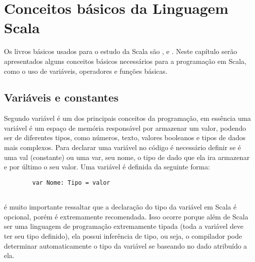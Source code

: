 

\chapter{ Conceitos b\'{a}sicos da Linguagem Scala}

Os livros b\'{a}sicos usados para o estudo da Scala s\~{a}o \cite{Odersky}, \cite{Sfregola2021} e \cite{Wampler2021}.
Neste cap\'{i}tulo serão apresentados alguns conceitos b\'{a}sicos necess\'{a}rios para a programa\c{c}\~{a}o em Scala, como o uso de vari\'{a}veis, operadores e funções b\'{a}sicas.


    \section{Vari\'{a}veis e constantes}
	
	Segundo \cite{Odersky} vari\'{a}vel \'{e} um dos principais conceitos da programa\c{c}\~{a}o, em ess\^{e}ncia uma vari\'{a}vel \'{e} um espaço de mem\'{o}ria respons\'{a}vel por armazenar um valor, podendo ser de diferentes tipos, como n\'{u}meros, texto, valores booleanos e tipos de dados mais complexos. Para declarar uma vari\'{a}vel no c\'{o}digo \'{e} necess\'{a}rio definir se \'{e} uma val (constante) ou uma var, seu nome, o tipo de dado que ela ira armazenar e por   \'{u}ltimo o seu valor.
	Uma vari\'{a}vel \'{e} definida da seguinte forma:
	
    \begin{lstlisting}
    	var Nome: Tipo = valor
	
	\end{lstlisting}

	\'{e} muito importante ressaltar que a declara\c{c}\~{a}o do tipo da vari\'{a}vel em Scala \'{e} opcional, por\'{e}m \'{e} extremamente recomendada. Isso ocorre porque al\'{e}m de Scala ser uma linguagem de programa\c{c}\~{a}o extremamente tipada (toda a vari\'{a}vel deve ter seu tipo definido), ela possui infer\^{e}ncia de tipo, ou seja, o compilador pode determinar automaticamente o tipo da vari\'{a}vel se baseando no dado atribu\'{i}do a ela.
	
